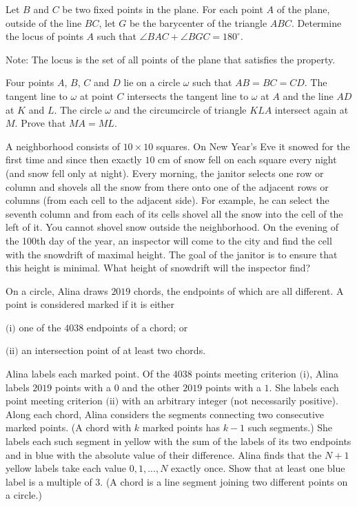 \documentclass[11pt]{scrartcl}
\begin{document}
\begin{problem}[2143833415170817930]
Let $B$ and $C$ be two fixed points in the plane. For each point $A$ of the plane, outside of the line $BC$, let $G$ be the barycenter of the triangle $ABC$. Determine the locus of points $A$ such that $\angle BAC + \angle BGC = 180^{\circ}$.

Note: The locus is the set of all points of the plane that satisfies the property.
\end{problem}
\begin{problem}[2153848747665754338]
	Four points $A$, $B$, $C$ and $D$ lie on a circle $\omega$ such that $AB=BC=CD$. The tangent line to $\omega$ at point $C$ intersects the tangent line to $\omega$ at $A$ and the line $AD$ at $K$ and $L$. The circle $\omega$ and the circumcircle of triangle $KLA$ intersect again at $M$. Prove that $MA=ML$.
\end{problem}
\begin{problem}[2201137214247796233]
A neighborhood consists of $10 \times 10$ squares. On New Year's Eve it snowed for the first time and since then exactly $10$ cm of snow fell on each square every night (and snow fell only at night). Every morning, the janitor selects one row or column and shovels all the snow from there onto one of the adjacent rows or columns (from each cell to the adjacent side). For example, he can select the seventh column and from each of its cells shovel all the snow into the cell of the left of it. You cannot shovel snow outside the neighborhood. On the evening of the 100th day of the year, an inspector will come to the city and find the cell with the snowdrift of maximal height. The goal of the janitor is to ensure that this height is minimal. What height of snowdrift will the inspector find?
\end{problem}
\begin{problem}[2210005554575274405]
On a circle, Alina draws $2019$ chords, the endpoints of which are all different. A point is considered marked if it is either

$\text{(i)}$ one of the $4038$ endpoints of a chord; or

$\text{(ii)}$ an intersection point of at least two chords.

Alina labels each marked point. Of the $4038$ points meeting criterion $\text{(i)}$, Alina labels $2019$ points with a $0$ and the other $2019$ points with a $1$. She labels each point meeting criterion $\text{(ii)}$ with an arbitrary integer (not necessarily positive).
Along each chord, Alina considers the segments connecting two consecutive marked points. (A chord with $k$ marked points has $k-1$ such segments.) She labels each such segment in yellow with the sum of the labels of its two endpoints and in blue with the absolute value of their difference.
Alina finds that the $N + 1$ yellow labels take each value $0, 1, . . . , N$ exactly once. Show that at least one blue label is a multiple of $3$.
(A chord is a line segment joining two different points on a circle.)
\end{problem}
\end{document}
